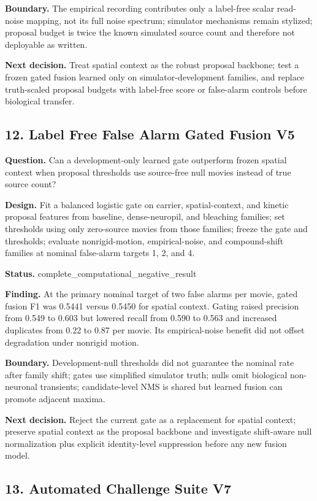 \textbf{Boundary.} The empirical recording contributes only a label-free scalar read-noise mapping, not its full noise spectrum; simulator mechanisms remain stylized; proposal budget is twice the known simulated source count and therefore not deployable as written.

\textbf{Next decision.} Treat spatial context as the robust proposal backbone; test a frozen gated fusion learned only on simulator-development families, and replace truth-scaled proposal budgets with label-free score or false-alarm controls before biological transfer.

\subsection{12. Label Free False Alarm Gated Fusion V5}

\textbf{Question.} Can a development-only learned gate outperform frozen spatial context when proposal thresholds use source-free null movies instead of true source count?

\textbf{Design.} Fit a balanced logistic gate on carrier, spatial-context, and kinetic proposal features from baseline, dense-neuropil, and bleaching families; set thresholds using only zero-source movies from those families; freeze the gate and thresholds; evaluate nonrigid-motion, empirical-noise, and compound-shift families at nominal false-alarm targets 1, 2, and 4.

\textbf{Status.} complete\_computational\_negative\_result

\textbf{Finding.} At the primary nominal target of two false alarms per movie, gated fusion F1 was 0.5441 versus 0.5450 for spatial context. Gating raised precision from 0.549 to 0.603 but lowered recall from 0.590 to 0.563 and increased duplicates from 0.22 to 0.87 per movie. Its empirical-noise benefit did not offset degradation under nonrigid motion.

\textbf{Boundary.} Development-null thresholds did not guarantee the nominal rate after family shift; gates use simplified simulator truth; nulls omit biological non-neuronal transients; candidate-level NMS is shared but learned fusion can promote adjacent maxima.

\textbf{Next decision.} Reject the current gate as a replacement for spatial context; preserve spatial context as the proposal backbone and investigate shift-aware null normalization plus explicit identity-level suppression before any new fusion model.

\subsection{13. Automated Challenge Suite V7}

